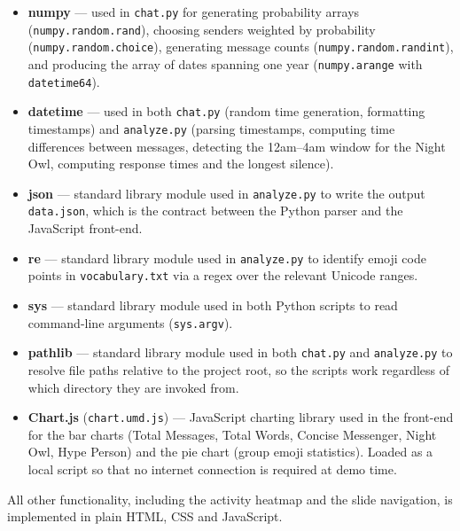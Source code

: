 \documentclass[12pt]{article}
\begin{document}
\begin{itemize}
    \item \textbf{numpy} --- used in \texttt{chat.py} for generating probability
    arrays (\texttt{numpy.random.rand}), choosing senders weighted by
    probability (\texttt{numpy.random.choice}), generating message counts
    (\texttt{numpy.random.randint}), and producing the array of dates spanning
    one year (\texttt{numpy.arange} with \texttt{datetime64}).

    \item \textbf{datetime} --- used in both
    \texttt{chat.py} (random time generation, formatting timestamps) and
    \texttt{analyze.py} (parsing timestamps, computing time differences between
    messages, detecting the 12am--4am window for the Night Owl, computing
    response times and the longest silence).

    \item \textbf{json} --- standard library module used in \texttt{analyze.py}
    to write the output \texttt{data.json}, which is the contract between the
    Python parser and the JavaScript front-end.

    \item \textbf{re} --- standard library module used in \texttt{analyze.py}
    to identify emoji code points in \texttt{vocabulary.txt} via a regex over
    the relevant Unicode ranges.

    \item \textbf{sys} --- standard library module used in both Python scripts
    to read command-line arguments (\texttt{sys.argv}).

    \item \textbf{pathlib} --- standard library module used in both
    \texttt{chat.py} and \texttt{analyze.py} to resolve file paths relative
    to the project root, so the scripts work regardless of which directory
    they are invoked from.

    \item \textbf{Chart.js} (\texttt{chart.umd.js}) --- JavaScript charting
    library used in the front-end for the bar charts (Total Messages, Total
    Words, Concise Messenger, Night Owl, Hype Person) and the pie chart
    (group emoji statistics). Loaded as a local script so that no internet
    connection is required at demo time.
\end{itemize}

All other functionality, including the activity heatmap and the slide
navigation, is implemented in plain HTML, CSS and JavaScript.
\end{document}
